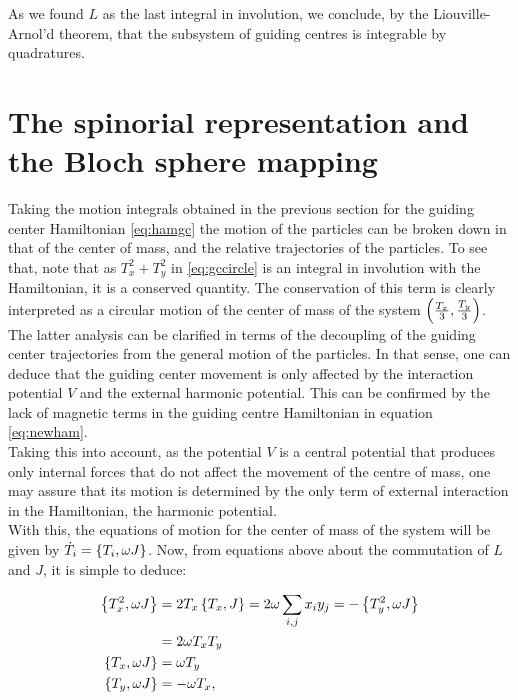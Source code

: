 As we found $L$ as the last integral in involution, we conclude, by the Liouville-Arnol'd theorem, that the subsystem of guiding centres is integrable by quadratures.\\

\section{The spinorial representation and the Bloch sphere mapping}
Taking the motion integrals obtained in the previous section for the guiding center Hamiltonian \eqref{eq:hamgc} the motion of the particles can be broken down in that of the center of mass, and the relative trajectories of the particles. To see that, note that as $T_x^2 + T_y^2$ in \eqref{eq:gccircle} is an integral in involution with the Hamiltonian, it is a conserved quantity. The conservation of this term is clearly interpreted as a circular motion of the center of mass of the system $\left( \frac{T_x}{3},\frac{T_y}{3} \right)$.\\

The latter analysis can be clarified in terms of the decoupling of the guiding center trajectories from the general motion of the particles. In that sense, one can deduce that the guiding center movement is only affected by the interaction potential $V$ and the external harmonic potential. This can be confirmed by the lack of magnetic terms in the guiding centre Hamiltonian in equation \eqref{eq:newham}.\\

Taking this into account, as the potential $V$ is a central potential that produces only internal forces that do not affect the movement of the centre of mass, one may assure that its motion is determined by the only term of external interaction in the Hamiltonian, the harmonic potential.\\

With this, the equations of motion for the center of mass of the system will be given by $\dot{T}_i = \left\lbrace T_i, {\omega}J \right\rbrace$. Now, from equations above about the commutation of $L$ and $J$, it is simple to deduce:

\begin{align*}
\left\lbrace T_x^2, \omega J \right\rbrace &= 2T_x\left\lbrace T_x, J \right\rbrace = 2\omega\sum_{i,j}x_iy_j = -\left\lbrace T_y^2, \omega J \right\rbrace\\
&= 2\omega T_xT_y \\
\left\lbrace T_x, \omega J \right\rbrace &= \omega T_y\\
\left\lbrace T_y, \omega J \right\rbrace &= -\omega T_x,
\end{align*}

